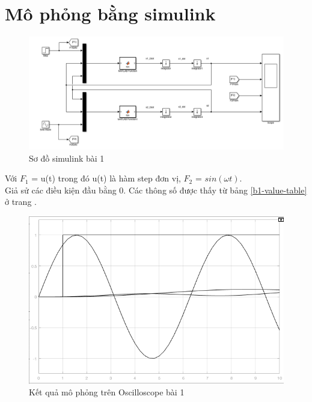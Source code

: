 \documentclass{standalone}
\begin{document}
	\section{Mô phỏng bằng simulink}%
	\begin{figure}[!htp]
		\centering
		\includegraphics[scale=0.35]{images/b1-simu}
		\caption{Sơ đồ simulink bài 1}
		\label{b1-simu}
	\end{figure}
	\pagebreak
	Với $F_1$ = u(t) trong đó u(t) là hàm step đơn vị, $F_2$ = $sin(\omega t)$.\\
	Giả sử các điều kiện đầu bằng 0. Các thông số được thấy từ bảng \ref{b1-value-table} ở trang \pageref{b1-value-table}.\\
	\begin{figure}[!htp]
		\centering
		\includegraphics[scale=0.5]{images/b1-scop}
		\caption{Kết quả mô phỏng trên Oscilloscope bài 1}
		\label{b1-scop}
	\end{figure}
	
	
	
	
	
\end{document}

